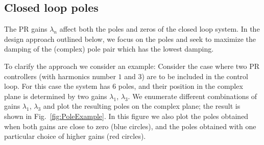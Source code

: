 \documentclass[conference,10pt]{IEEEtran}
\begin{document}
\subsection{Closed loop poles}
The PR gains $\lambda_n$ affect both the poles and zeros of the closed loop system. In the design approach outlined below, we focus on the poles and seek to maximize the damping of the (complex) pole pair which has the lowest damping.

To clarify the approach we consider an example: Consider the case where two PR controllers (with harmonics number $1$ and $3$) are to be included in the control loop. For this case the system has $6$ poles, and their position in the complex plane is determined by  two gains $\lambda_1$, $\lambda_3$.
We enumerate different combinations of gains $\lambda_1$, $\lambda_3$ and plot the resulting poles on the complex plane; the result is shown in Fig.~\ref{fig:PoleExample}. In this figure we also plot the poles obtained when both gains are close to zero (blue circles), and the poles obtained with one particular choice of higher gains (red circles).
\end{document}
